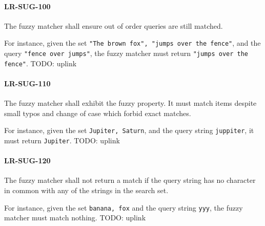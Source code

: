 \paragraph{LR-SUG-100}
The fuzzy matcher shall ensure out of order queries are still matched.

For instance, given the set \lstinline{"The brown fox", "jumps over the fence"},
and the query \lstinline{"fence over jumps"}, the fuzzy matcher must
return \lstinline{"jumps over the fence"}.
TODO: uplink

\paragraph{LR-SUG-110}
The fuzzy matcher shall exhibit the fuzzy property. It must match
items despite small typos and change of case
which forbid exact matches.

For instance, given the set \lstinline{Jupiter, Saturn}, and the
query string \lstinline{juppiter}, it must return \lstinline{Jupiter}.
TODO: uplink

\paragraph{LR-SUG-120}
The fuzzy matcher shall not return a match if the query string
has no character in common with any of the strings in the search
set.

For instance, given the set \lstinline{banana, fox} and the query
string \lstinline{yyy}, the fuzzy matcher must match nothing.
TODO: uplink

